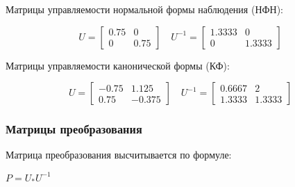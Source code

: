 Матрицы управляемости нормальной формы наблюдения (НФН):

\begin{equation*}
\text{$U=\begin{bmatrix} 0.75 &         0 \\
         0  &  0.75 \end{bmatrix}$}
\quad
\text{$U^{-1}=\begin{bmatrix} 1.3333   &      0 \\
         0  &  1.3333 \end{bmatrix}$}
\end{equation*}

Матрицы управляемости канонической формы (КФ):

\begin{equation*}
\text{$U=\begin{bmatrix}  -0.75  &  1.125 \\
    0.75  & -0.375 \end{bmatrix}$}
\quad
\text{$U^{-1}=\begin{bmatrix} 0.6667 &   2 \\
    1.3333  &  1.3333 \end{bmatrix}$}
\end{equation*}

\subsubsection{Матрицы преобразования}

Матрица преобразования высчитывается по формуле:

\begin{center}
$P=U_{*}U^{-1}$
\end{center}

